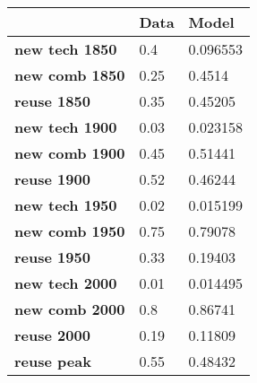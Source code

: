 \begin{tabular}{|l|l|l|}
\hline
&\textbf{Data}&\textbf{Model}\\\hline
\textbf{new tech 1850}&0.4&0.096553\\\hline
\textbf{new comb 1850}&0.25&0.4514\\\hline
\textbf{reuse 1850}&0.35&0.45205\\\hline
\textbf{new tech 1900}&0.03&0.023158\\\hline
\textbf{new comb 1900}&0.45&0.51441\\\hline
\textbf{reuse 1900}&0.52&0.46244\\\hline
\textbf{new tech 1950}&0.02&0.015199\\\hline
\textbf{new comb 1950}&0.75&0.79078\\\hline
\textbf{reuse 1950}&0.33&0.19403\\\hline
\textbf{new tech 2000}&0.01&0.014495\\\hline
\textbf{new comb 2000}&0.8&0.86741\\\hline
\textbf{reuse 2000}&0.19&0.11809\\\hline
\textbf{reuse peak}&0.55&0.48432\\\hline
\end{tabular}
